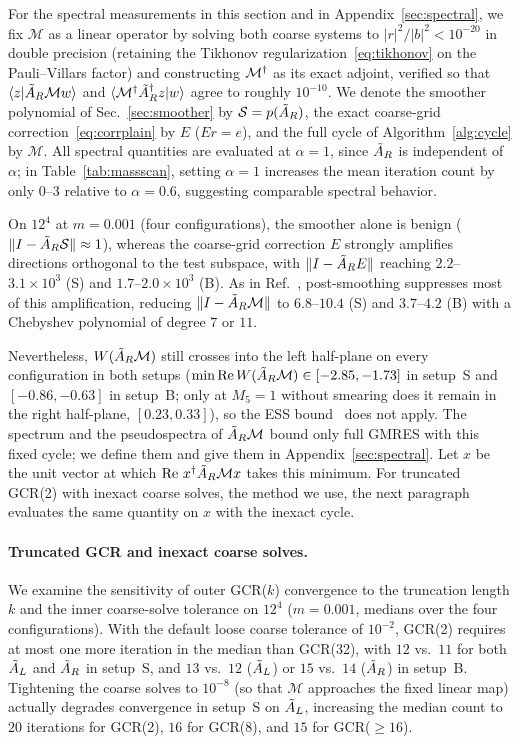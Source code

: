For the spectral measurements in this section \New and in Appendix~\ref{sec:spectral}, we fix $\mathcal M$ as a linear operator by solving
both coarse systems to $|r|^2/|b|^2<10^{-20}$ in double precision (retaining the Tikhonov
regularization~\eqref{eq:tikhonov} on the Pauli--Villars factor) and constructing $\mathcal M^{\dagger}$
as its exact adjoint, verified so that $\langle z|\tilde A_{R}\mathcal M w\rangle$ and
$\langle\mathcal M^{\dagger}\tilde A_{R}^{\dagger} z|w\rangle$ agree to roughly $10^{-10}$. We denote the smoother
polynomial of Sec.~\ref{sec:smoother} by $\mathcal S=p(\tilde A_{R})$, the exact coarse-grid
correction~\eqref{eq:corrplain} by $E$ ($Er=e$), and the full cycle of Algorithm~\ref{alg:cycle} by
$\mathcal M$. All spectral quantities are evaluated at $\alpha=1$, since $\tilde A_{R}$ is independent of
$\alpha$; in Table~\ref{tab:massscan}, setting $\alpha=1$ increases the mean iteration count by
only $0$--$3$ relative to $\alpha=0.6$, suggesting comparable spectral behavior.

On $12^4$ at $m=0.001$ (four configurations), the smoother alone is benign
($\|I-\tilde A_{R}\mathcal S\|\approx1$), whereas the coarse-grid correction $E$ strongly amplifies
directions orthogonal to the test subspace, with $\|I-\tilde A_{R} E\|$ reaching $2.2$--$3.1\times10^3$ (S)
and $1.7$--$2.0\times10^3$ (B). As in Ref.~\cite{EickMawhinney}, post-smoothing suppresses most of
this amplification, reducing $\|I-\tilde A_{R}\mathcal M\|$ to $6.8$--$10.4$ (S) and $3.7$--$4.2$ (B) with
a Chebyshev polynomial of degree $7$ or $11$.

\New Nevertheless, $W(\tilde A_{R}\mathcal M)$ still crosses into
the left half-plane on every configuration in both setups ($\min\operatorname{Re} W(\tilde A_{R}\mathcal M)\in[-2.85,-1.73]$
in setup~S and $[-0.86,-0.63]$ in setup~B; only at $M_5=1$ without smearing does it remain in the
right half-plane, $[0.23,0.33]$), so the ESS bound~\cite{ESS} does not apply. \New The spectrum and
the pseudospectra of $\tilde A_{R}\mathcal M$ bound only full GMRES with this fixed cycle; we define them and give them in
Appendix~\ref{sec:spectral}. Let $x$ be the unit vector at which $\operatorname{Re}\,x^{\dagger}\tilde A_{R}\mathcal Mx$ takes this minimum. For
truncated GCR(2) with inexact coarse solves, the method we use, the next paragraph evaluates the same
quantity on $x$ with the inexact cycle.

\paragraph{Truncated GCR and inexact coarse solves.}\label{sec:gcrk} We examine the sensitivity of outer GCR($k$) convergence to the truncation length $k$ and the
inner coarse-solve tolerance on $12^4$ ($m=0.001$, medians over the four configurations). With the
default loose coarse tolerance of $10^{-2}$, GCR(2) requires at most one more iteration in the
median than GCR(32), with $12$ vs.\ $11$ for both $\tilde A_{L}$ and $\tilde A_{R}$ in setup~S, and $13$ vs.\ $12$
($\tilde A_{L}$) or $15$ vs.\ $14$ ($\tilde A_{R}$) in setup~B. Tightening the coarse solves to $10^{-8}$ (so that
$\mathcal M$ approaches the fixed linear map) actually degrades convergence in setup~S on $\tilde A_{L}$,
increasing the median count to $20$ iterations for GCR(2), $16$ for GCR(8), and $15$ for
GCR($\ge16$).

